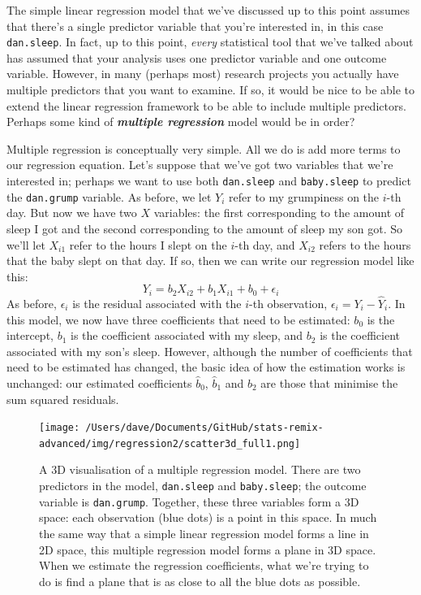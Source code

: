 \documentclass[
]{book}
\begin{document}
The simple linear regression model that we've discussed up to this point assumes that there's a single predictor variable that you're interested in, in this case \texttt{dan.sleep}. In fact, up to this point, \emph{every} statistical tool that we've talked about has assumed that your analysis uses one predictor variable and one outcome variable. However, in many (perhaps most) research projects you actually have multiple predictors that you want to examine. If so, it would be nice to be able to extend the linear regression framework to be able to include multiple predictors. Perhaps some kind of \textbf{\emph{multiple regression}} model would be in order?

Multiple regression is conceptually very simple. All we do is add more terms to our regression equation. Let's suppose that we've got two variables that we're interested in; perhaps we want to use both \texttt{dan.sleep} and \texttt{baby.sleep} to predict the \texttt{dan.grump} variable. As before, we let \(Y_i\) refer to my grumpiness on the \(i\)-th day. But now we have two \(X\) variables: the first corresponding to the amount of sleep I got and the second corresponding to the amount of sleep my son got. So we'll let \(X_{i1}\) refer to the hours I slept on the \(i\)-th day, and \(X_{i2}\) refers to the hours that the baby slept on that day. If so, then we can write our regression model like this:
\[
Y_i = b_2 X_{i2} + b_1 X_{i1} + b_0 + \epsilon_i
\]
As before, \(\epsilon_i\) is the residual associated with the \(i\)-th observation, \(\epsilon_i = {Y}_i - \hat{Y}_i\). In this model, we now have three coefficients that need to be estimated: \(b_0\) is the intercept, \(b_1\) is the coefficient associated with my sleep, and \(b_2\) is the coefficient associated with my son's sleep. However, although the number of coefficients that need to be estimated has changed, the basic idea of how the estimation works is unchanged: our estimated coefficients \(\hat{b}_0\), \(\hat{b}_1\) and \(\hat{b}_2\) are those that minimise the sum squared residuals.

\begin{figure}
\centering
\texttt{[image: /Users/dave/Documents/GitHub/stats-remix-advanced/img/regression2/scatter3d\_full1.png]}
\caption{\label{fig:multipleregression}A 3D visualisation of a multiple regression model. There are two predictors in the model, \texttt{dan.sleep} and \texttt{baby.sleep}; the outcome variable is \texttt{dan.grump}. Together, these three variables form a 3D space: each observation (blue dots) is a point in this space. In much the same way that a simple linear regression model forms a line in 2D space, this multiple regression model forms a plane in 3D space. When we estimate the regression coefficients, what we're trying to do is find a plane that is as close to all the blue dots as possible.}
\end{figure}
\end{document}
